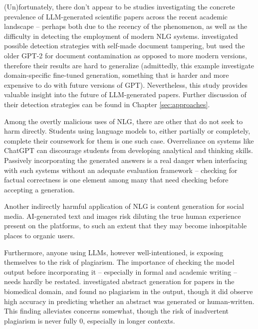 (Un)fortunately, there don't appear to be studies investigating the concrete prevalence of LLM-generated scientific papers across the recent academic landscape -- perhaps both due to the recency of the phenomenon, as well as the difficulty in detecting the employment of modern NLG systems.
\citet{rodriguez2022cross} investigated possible detection strategies with self-made document tampering, but used the older GPT-2 for document contamination as opposed to more modern versions, therefore their results are hard to generalize
(admittedly, this example investigate domain-specific fine-tuned generation, something that is harder and more expensive to do with future versions of GPT).
Nevertheless, this study provides valuable insight into the future of LLM-generated papers. Further discussion of their detection strategies can be found in Chapter \ref{sec:approaches}.

Among the overtly malicious uses of NLG, there are other that do not seek to harm directly.
Students using language models to, either partially or completely, complete their coursework for them is one such case.
Overreliance on systems like ChatGPT can discourage students from developing analytical and thinking skills.
Passively incorporating the generated answers is a real danger when interfacing with such systems without an adequate evaluation framework -- checking for factual correctness is one element among many that need checking before accepting a generation.

Another indirectly harmful application of NLG is content generation for social media.
AI-generated text and images risk diluting the true human experience present on the platforms, to such an extent that they may become inhospitable places to organic users.

Furthermore, anyone using LLMs, however well-intentioned, is exposing themselves to the risk of plagiarism.
The importance of checking the model output before incorporating it -- especially in formal and academic writing -- needs hardly be restated.
\citet{gao2022comparing} investigated abstract generation for papers in the biomedical domain, and found no plagiarism in the output, though it did observe high accuracy in predicting whether an abstract was generated or human-written.
This finding alleviates concerns somewhat, though the risk of inadvertent plagiarism is never fully 0, especially in longer contexts.